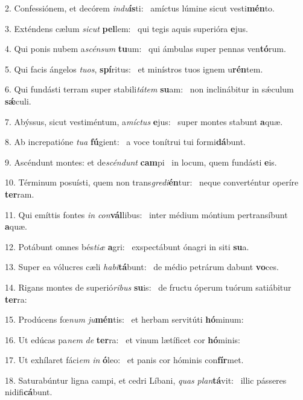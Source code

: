 2. Confessiónem, et decórem \textit{ind}\textit{u}\textbf{ís}ti: \ast\  amíctus lúmine sicut vesti\textbf{mén}to.\

3. Exténdens cælum \textit{sic}\textit{ut} \textbf{pel}lem: \ast\  qui tegis aquis superióra \textbf{e}jus.\

4. Qui ponis nubem a\textit{scén}\textit{sum} \textbf{tu}um: \ast\  qui ámbulas super pennas ven\textbf{tó}rum.\

5. Qui facis ángelos \textit{tu}\textit{os}, \textbf{spí}ritus: \ast\  et minístros tuos ignem u\textbf{rén}tem.\

6. Qui fundásti terram super stabili\textit{tá}\textit{tem} \textbf{su}am: \ast\  non inclinábitur in sǽculum \textbf{sǽ}culi.\

7. Abýssus, sicut vestiméntum, a\textit{míc}\textit{tus} \textbf{e}jus: \ast\  super montes stabunt \textbf{a}quæ.\

8. Ab increpatióne \textit{tu}\textit{a} \textbf{fú}gient: \ast\  a voce tonítrui tui formi\textbf{dá}bunt.\

9. Ascéndunt montes: et de\textit{scén}\textit{dunt} \textbf{cam}pi \ast\  in locum, quem fundásti \textbf{e}is.\

10. Términum posuísti, quem non trans\textit{gre}\textit{di}\textbf{én}tur: \ast\  neque converténtur operíre \textbf{ter}ram.\

11. Qui emíttis fontes \textit{in} \textit{con}\textbf{vál}libus: \ast\  inter médium móntium pertransíbunt \textbf{a}quæ.\

12. Potábunt omnes bés\textit{ti}\textit{æ} \textbf{a}gri: \ast\  exspectábunt ónagri in siti \textbf{su}a.\

13. Super ea vólucres cæli \textit{ha}\textit{bi}\textbf{tá}bunt: \ast\  de médio petrárum dabunt \textbf{vo}ces.\

14. Rigans montes de superió\textit{ri}\textit{bus} \textbf{su}is: \ast\  de fructu óperum tuórum satiábitur \textbf{ter}ra:\

15. Prodúcens fœ\textit{num} \textit{ju}\textbf{mén}tis: \ast\  et herbam servitúti \textbf{hó}minum:\

16. Ut edúcas pa\textit{nem} \textit{de} \textbf{ter}ra: \ast\  et vinum lætíficet cor \textbf{hó}minis:\

17. Ut exhílaret fáci\textit{em} \textit{in} \textbf{ó}leo: \ast\  et panis cor hóminis con\textbf{fír}met.\

18. Saturabúntur ligna campi, et cedri Líbani, \textit{quas} \textit{plan}\textbf{tá}vit: \ast\  illic pásseres nidifi\textbf{cá}bunt.\

